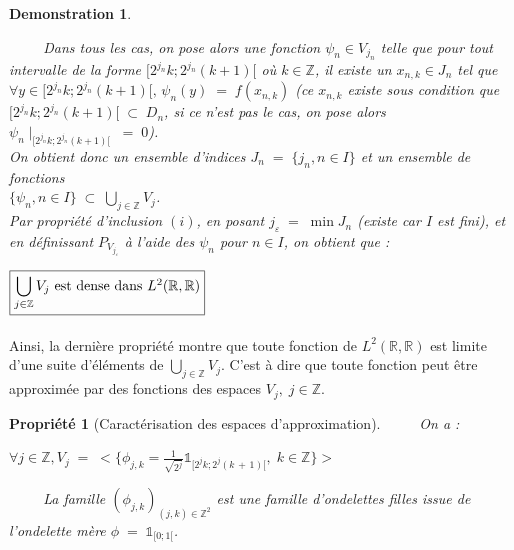\documentclass[a4paper,10pt]{report}
\theoremstyle{break}
\newtheorem{Prop}{Propri\'{e}t\'{e}}
\newtheorem{Dem}{Demonstration}
\begin{document}
\begin{Dem}
\begin{itemize}
	  $\phantom{Prop}$ Dans tous les cas, on pose alors une fonction $ \psi_n \in V_{j_n} $ telle que pour tout intervalle de la forme $[2^{j_n} k; 2^{j_n} (k + 1)[$ o\`{u} $k \in \mathbb{Z}$,
	  il existe un $x_{n,k} \in J_n$ tel que $ \forall y \in [2^{j_n} k; 2^{j_n} (k + 1)[, \, \psi_n (y) \; = \; f(x_{n,k})$ 
	  (ce $x_{n,k}$ existe sous condition que $ [2^{j_n} k; 2^{j_n} (k + 1)[ \; \subset \; D_n $, si ce n'est pas le cas,
	  on pose alors $ \psi_n \mid_{[2^{j_n} k; 2^{j_n} (k + 1)[} \; = \; 0$). \\
	  
	  On obtient donc un ensemble d'indices $J_n \; = \; \Big\{ j_n, n \in I \Big\}$
	  et un ensemble de fonctions\\ $\Big\{ \psi_n , n \in I \Big\} \; \subset \; \displaystyle \bigcup_{j \in \mathbb{Z}} V_j $. \\
	  
	  Par propri\'{e}t\'{e} d'inclusion $(i)$, en posant $j_{\varepsilon} \; = \; \min J_n$ (existe car $I$ est fini),
	  et en d\'{e}finissant $P_{V_{j_{\varepsilon}}}$ \`{a} l'aide des $\psi_n$ pour $n \in I$, on obtient que :
	  
	  \begin{center}
	    $ \boxed{\displaystyle \bigcup_{j \in \mathbb{Z}} V_j $ est dense dans $ L^2(\mathbb{R}, \mathbb{R})} $
	  \end{center}


      \end{itemize}

    \end{Dem}

      
    \paragraph{} Ainsi, la derni\`{e}re propri\'{e}t\'{e} montre que toute fonction de $ L^2(\mathbb{R}, \mathbb{R}) $ est
	  limite d'une suite d'\'{e}l\'{e}ments de  $ \displaystyle \bigcup_{j \in \mathbb{Z}} V_j $. C'est \`{a} dire que toute fonction
	  peut \^{e}tre approxim\'{e}e par des fonctions des espaces $ V_j, \; j \in \mathbb{Z} $. 
	  
    \begin{Prop}[Caract\'{e}risation des espaces d'approximation]
	  $\phantom{Prop}$ On a : 
	  
	  \begin{center}
	  $ \forall j \in \mathbb{Z}, V_j \; = \; 
	  \Bigg< \Big\{ \phi_{j,k} = \frac{1}{\sqrt{2^j}} \mathbb{1}_{[2^j k; 2^j (k \, + \, 1)[}, \; k \in \mathbb{Z} \Big\} \Bigg> $ 
	  \end{center}
	  
	  $\phantom{Prop}$ La famille $ (\phi_{j, k})_{(j, k) \in \mathbb{Z}^2} $ est une famille d'ondelettes filles issue de l'ondelette
	    m\`{e}re $ \phi \; = \; \mathbb{1}_{[0 ; 1[} $.
    \end{Prop}
	    
\end{document}
